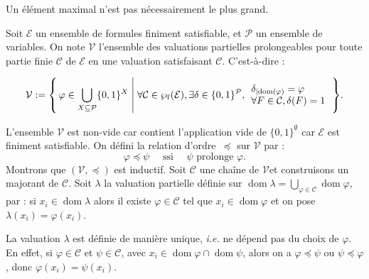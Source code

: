 \documentclass[./main]{subfiles}
\begin{document}
  \begin{rmk}
    Un élément maximal n'est pas nécessairement le plus grand.
  \end{rmk}

  \vspace{1.5em}

  \begin{prv}
    Soit $\mathcal{E}$ un ensemble de formules finiment satisfiable, et $\mathcal{P}$ un ensemble de variables.
    On note $\mathcal{V}$ l'ensemble des valuations partielles prolongeables pour toute partie finie $\mathcal{C}$ de $\mathcal{E}$ en une valuation satisfaisant $\mathcal{C}$.
    C'est-à-dire :

    {
      \footnotesize
    \[
    \mathcal{V} := \mleft\{\,\varphi \in \bigcup_{X \subseteq \mathcal{P}} \{0,1\}^X \;\middle|\; \forall \mathcal{C} \in \wp_\mathrm{f}(\mathcal{E}), \exists \delta \in \{0,1\}^\mathcal{P}, 
      \begin{array}{l}
        \delta_{|\mathrm{dom}(\varphi)} = \varphi\\
        \forall F \in \mathcal{C}, \delta(F) = 1
      \end{array}
    \,\mright\} 
    .\] 
    }

    L'ensemble $\mathcal{V}$ est non-vide car contient l'application vide de $\{0,1\}^\emptyset$ car $\mathcal{E}$ est finiment satisfiable.
    On défini la relation d'ordre~$\preceq$ sur  $\mathcal{V}$ par : \[
      \varphi \preceq \psi \quad \text{ ssi } \quad \psi \text{ prolonge } \varphi
    .\]
    Montrons que $(\mathcal{V}, \preceq)$ est inductif.
    Soit $\mathcal{C}$ une chaîne de $\mathcal{V}$et construisons un majorant de $\mathcal{C}$.
    Soit $\lambda$ la valuation partielle définie sur $\operatorname{dom}\lambda = \bigcup_{\varphi \in \mathcal{C}} \operatorname{dom} \varphi$, par : 
    si $x_i \in \operatorname{dom} \lambda$ alors il existe $\varphi \in \mathcal{C}$ tel que $x_i \in \operatorname{dom} \varphi$ et on pose $\lambda(x_i) = \varphi(x_i)$.

    La valuation $\lambda$ est définie de manière unique,  \textit{i.e.} ne dépend pas du choix de $\varphi$. En effet, si $\varphi \in \mathcal{C}$ et $\psi \in \mathcal{C}$, avec $x_i \in \operatorname{dom} \varphi \cap \operatorname{dom} \psi$, alors on a $\varphi \preceq \psi$ ou $\psi \preceq \varphi$, donc $\varphi(x_i) = \psi(x_i)$.


\end{prv}
\end{document}
